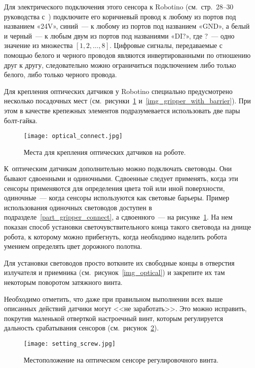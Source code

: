 Для электрического подключения этого сенсора к Robotino (см.~стр.~28--30 руководства с~\cite{news_manual}) подключите его коричневый провод к любому из портов под названием «24V», синий~--- к любому из портов под названием «GND», а белый и черный~--- к любым двум из портов под названиями «DI?», где ?~--- одно значение из множества $[1, 2, \ldots, 8]$.
Цифровые сигналы, передаваемые с помощью белого и черного проводов являются инвертированными по отношению друг к другу, следовательно можно ограничиться подключением либо только белого, либо только черного провода.

Для крепления оптических датчиков у Robotino специально предусмотрено несколько посадочных мест (см.~рисунки~\ref{img_optical_connect} и~\ref{img_gripper_with_barrier}).
При этом в качестве крепежных элементов подразумевается использовать две пары болт-гайка.

\begin{figure}[h!]
	\centering
	\texttt{[image: optical\_connect.jpg]}
	\caption{Места для крепления оптических датчиков на роботе.}
	\label{img_optical_connect}
\end{figure}

К~оптическим датчикам дополнительно можно подключать световоды.
Они бывают сдвоенными и одиночными.
Сдвоенные следует применять, когда эти сенсоры применяются для определения цвета той или иной поверхности, одиночные~--- когда сенсоры используются как световые барьеры.
Пример использования одиночных световодов доступен в подразделе~\ref{part_gripper_connect}, а сдвоенного~--- на рисунке~\ref{img_optical_connect}.
На нем показан способ установки светочувствительного конца такого световода на днище робота, к которому можно прибегнуть, когда необходимо наделить робота умением определять цвет дорожного полотна.

Для установки световодов просто воткните их свободные концы в отверстия излучателя и приемника (см.~рисунок~\ref{img_optical}) и закрепите их там некоторым поворотом затяжного винта.

Необходимо отметить, что даже при правильном выполнении всех выше описанных действий датчики могут <<не заработать>>.
Это можно исправить, покрутив маленькой отверткой настроечный винт, которым регулируется дальность срабатывания сенсоров (см.~рисунок~\ref{img_setting_screw}).

\begin{figure}[h!]
	\centering
	\texttt{[image: setting\_screw.jpg]}
	\caption{Местоположение на оптическом сенсоре регулировочного винта.}
	\label{img_setting_screw}
\end{figure}




